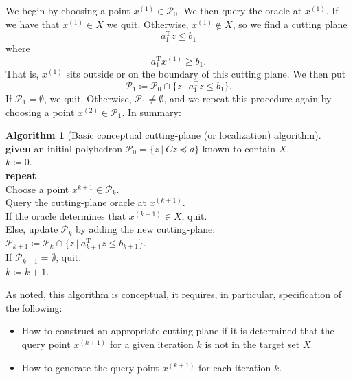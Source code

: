 \documentclass[11pt]{amsart}
\theoremstyle{definition}
\newtheorem{algorithm}{Algorithm}[section]
\theoremstyle{remark}
\newcommand{\ind}{\hspace*{0.5cm}}
\newcommand{\transpose}{\text{T}}
\begin{document}
        We begin by choosing a point $x^{(1)} \in \mathcal{P}_0$. We then query the oracle at $x^{(1)}$. If we have that $x^{(1)} \in X$ we quit. Otherwise, $x^{(1)} \not\in X$, so we find a cutting plane 
        \begin{equation*}
            a_1^{\transpose}z \leq b_1
        \end{equation*}
        where
        \begin{equation*}
            a_1^{\transpose}x^{(1)} \geq b_1.
        \end{equation*}
        That is, $x^{(1)}$ sits outside or on the boundary of this cutting plane. We then put 
        \begin{equation*}
            \mathcal{P}_1 \coloneqq \mathcal{P}_0 \cap \{z \:|\: a_1^{\transpose}z \leq b_1\}.
        \end{equation*}
        If $\mathcal{P}_1 = \emptyset$, we quit. Otherwise, $\mathcal{P}_1 \neq \emptyset$, and we repeat this procedure again by choosing a point $x^{(2)} \in \mathcal{P}_1$. In summary:
        \begin{algorithm}[Basic conceptual cutting-plane (or localization) algorithm]
        \label{a:basic_conceptual_cp_alg}\mbox{}\\
            \ind \textbf{given} an initial polyhedron $\mathcal{P}_0 = \{z \:|\: Cz \preceq d\}$ known to contain $X$. \\
            \ind $k \coloneqq 0$. \\
            \ind \textbf{repeat} \\
            \ind\ind Choose a point $x^{k+1} \in \mathcal{P}_k$. \\
            \ind\ind Query the cutting-plane oracle at $x^{(k+1)}$. \\
            \ind\ind If the oracle determines that $x^{(k+1)} \in X$, quit. \\
            \ind\ind Else, update $\mathcal{P}_k$ by adding the new cutting-plane: $\mathcal{P}_{k+1} \coloneqq \mathcal{P}_k \cap \{z \:|\: a_{k+1}^\transpose z \leq b_{k+1} \}$. \\
            \ind\ind If $\mathcal{P}_{k+1} = \emptyset$, quit. \\
            \ind\ind $k \coloneqq k+1$.
        \end{algorithm}
        As noted, this algorithm is conceptual, it requires, in particular, specification of the following: 
        \begin{itemize}
            \item How to construct an appropriate cutting plane if it is determined that the query point $x^{(k+1)}$ for a given iteration $k$ is not in the target set $X$.
            \item How to generate the query point $x^{(k+1)}$ for each iteration $k$.
        \end{itemize}
\end{document}
